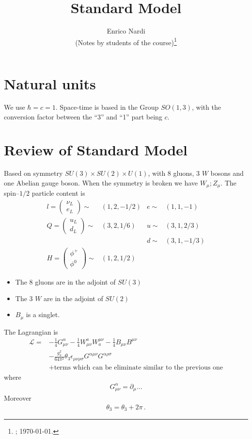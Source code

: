 \documentclass[12pt,letterpaper]{article}
\title{Standard Model}
\author{Enrico Nardi\\
(Notes by students of the course)\thanks{\currenttime; \today.}}
\date{}
\begin{document}
\maketitle

\section{Natural units}
We use $\hbar=c=1$.  
Space-time is based in the Group $SO(1,3)$, with the conversion factor between the ``3'' and ``1'' part being $c$. 

\section{Review of Standard Model}
Based on symmetry $SU(3)\times SU(2)\times U(1)$, with 8 gluons, 3 $W$  bosons and one Abelian gauge boson. When the symmetry is broken we have $W_{\mu}; Z_{\mu}$. The spin--$1/2$ particle content is
\begin{align}
  l=
  \begin{pmatrix}
    \nu_L\\ e_{L}
  \end{pmatrix}\sim& (1,2,-1/2)  & e\sim&(1,1,-1)\\
  Q=
  \begin{pmatrix}
    u_L\\ d_L
  \end{pmatrix}\sim& (3,2,1/6)  & u\sim&(3,1,2/3)\\
&&d\sim&(3,1,-1/3)\\
  H=
  \begin{pmatrix}
    \phi^+\\ \phi^0
  \end{pmatrix}\sim& (1,2,1/2)  & &
\end{align}
\begin{itemize}
\item The 8 gluons are in the adjoint of $SU(3)$
\item The 3 $W$ are in the adjoint of $SU(2)$
\item $B_{\mu}$ is a singlet.
\end{itemize}
The Lagrangian is
\begin{align*}
  \mathcal{L}=&-\frac{1}{4}G_{\mu\nu}^{\alpha}-\frac{1}{4}W^{a}_{\mu\nu}W_{a}^{\mu\nu}
-\frac{1}{4}B_{\mu\nu}B^{\mu\nu}\\
&-\frac{g_3^2}{64\pi^2}\theta_3\epsilon_{\mu\nu\rho\sigma}G^{\alpha\mu\nu}G^{\alpha\rho\sigma}\\
&+\text{terms which can be eliminate similar to the previous one}
\end{align*}
where
\begin{align*}
  G_{\mu\nu}^{\alpha}=\partial_{\mu}...
\end{align*}
Moreover
\begin{align*}
  \theta_3=\theta_3+2\pi\,.
\end{align*}
\end{document}
